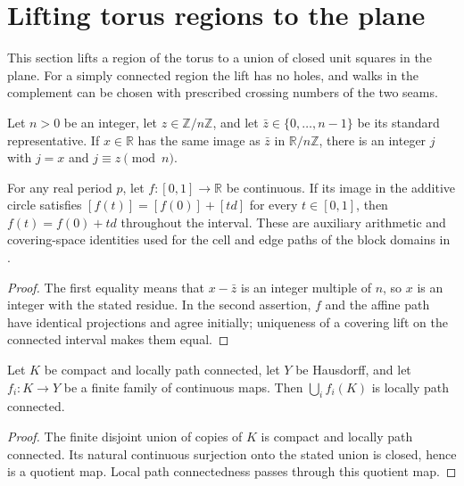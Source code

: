 \section{Lifting torus regions to the plane}%
\label{sec:peps_torus_region_lifts}

This section lifts a region of the torus to a union of closed unit squares in
the plane. For a simply connected region the lift has no holes, and walks in
the complement can be chosen with prescribed crossing numbers of the two
seams.

\begin{lemma}%
    \label{thm:peps_additive_circle_lift_coordinates}
    \leanok
    Let $n>0$ be an integer, let $z\in\mathbb Z/n\mathbb Z$, and let
    $\bar z\in\{0,\ldots,n-1\}$ be its standard representative.
    If $x\in\mathbb R$ has the same image as $\bar z$ in
    $\mathbb R/n\mathbb Z$, there is an integer $j$ with $j=x$ and
    $j\equiv z\pmod n$.

    For any real period $p$, let $f:[0,1]\to\mathbb R$ be continuous.
    If its image in the additive circle satisfies $[f(t)]=[f(0)]+[td]$
    for every $t\in[0,1]$, then $f(t)=f(0)+td$ throughout the interval.
    These are auxiliary
    arithmetic and covering-space identities used for the cell and
    edge paths of the block domains in \cite[\S6.3]{Schuch2010PEPS}.
\end{lemma}
\begin{proof}\leanok
    The first equality means that $x-\bar z$ is an integer multiple
    of $n$, so $x$ is an integer with the stated residue. In the
    second assertion, $f$ and the affine path have identical projections
    and agree initially; uniqueness of a covering lift on the connected
    interval makes them equal.
\end{proof}

\begin{lemma}%
    \label{thm:peps_finite_compact_cell_images}
    \leanok
    Let $K$ be compact and locally path connected, let $Y$ be Hausdorff,
    and let $f_i:K\to Y$ be a finite family of continuous maps. Then
    $\bigcup_i f_i(K)$ is locally path connected.
\end{lemma}
\begin{proof}\leanok
    The finite disjoint union of copies of $K$ is compact and locally
    path connected. Its natural continuous surjection onto the stated
    union is closed, hence is a quotient map. Local path connectedness
    passes through this quotient map.
\end{proof}

